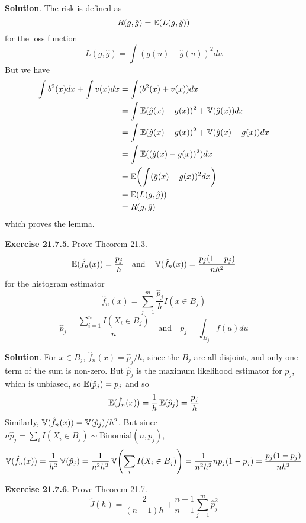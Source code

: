 \textbf{Solution}.
The risk is defined as
\[
R(g, \hat{g}) = \EXP\left(L(g, \hat{g}) \right)
\]
for the loss function
\[
L(g, \hat{g}) = \int (g(u) - \hat{g}(u))^{2} du
\]
But we have
\begin{align*}
\int b^{2}(x) dx + \int v(x) dx &= \int (b^{2}(x) + v(x)) dx \\
&= \int \EXP(\hat{g}(x) - g(x))^{2} + \VAR(\hat{g}(x)) dx \\
&= \int \EXP(\hat{g}(x) - g(x))^{2} + \VAR(\hat{g}(x) - g(x)) dx \\
&= \int \EXP((\hat{g}(x) - g(x))^{2}) dx \\
&= \EXP\left(\int (\hat{g}(x) - g(x))^{2} dx \right) \\
&= \EXP(L(g, \hat{g})) \\
&=  R(g, \hat{g})
\end{align*}
which proves the lemma.

\textbf{Exercise 21.7.5}. Prove Theorem 21.3.
\[
\operatorname{\mathbb{E}}(\hat{f}_{n}(x)) = \frac{p_{j}}{h} 
\quad \text{and} \quad
\operatorname{\mathbb{V}}(\hat{f}_{n}(x)) = \frac{p_{j} (1 - p_{j})}{nh^{2}}
\]
for the histogram estimator
\[
\hat{f}_{n}(x) = \sum_{j=1}^m \frac{\hat{p}_{j}}{h} I(x \in B_{j})
\]
\[
\hat{p}_{j} = \frac{\sum_{i=1}^{n} I(X_{i} \in B_{j})}{n}
\quad \text{and} \quad
p_{j} = \int_{B_{j}} f(u) du
\]

\textbf{Solution}.
For \(x \in B_{j}\), \(\hat{f}_{n}(x) = \hat{p}_{j} / h\), since the \(B_{j}\)
are all disjoint, and only one term of the sum is non-zero. But
\(\hat{p}_{j}\) is the maximum likelihood estimator for \(p_{j}\), which is
unbiased, so \(\operatorname{\mathbb{E}}(\hat{p}_{j}) = p_{j}\) and so
\[
\operatorname{\mathbb{E}}(\hat{f}_{n}(x)) = \frac{1}{h} \operatorname{\mathbb{E}}(\hat{p}_{j}) = \frac{p_{j}}{h}
\]
Similarly, \(\operatorname{\mathbb{V}}(\hat{f}_{n}(x)) = \operatorname{\mathbb{V}}(\hat{p}_{j}) / h^{2}\).
But since
\(n \hat{p}_{j} = \sum_{i} I(X_{i} \in B_{j}) \sim \text{Binomial}(n, p_{j})\),
\[
\VAR(\hat{f}_{n}(x)) = \frac{1}{h^{2}} \VAR(\hat{p}_{j}) = \frac{1}{n^{2}h^{2}} \VAR\left( \sum_{i} I(X_{i} \in B_{j}) \right) = \frac{1}{n^{2}h^{2}} n p_{j} (1 - p_{j}) = \frac{p_{j} (1 - p_{j})}{nh^{2}}
\]

\textbf{Exercise 21.7.6}. Prove Theorem 21.7.
\[
\hat{J}(h) = \frac{2}{(n - 1)h} + \frac{n+1}{n-1} \sum_{j=1}^m \hat{p}_{j}^{2}
\]

